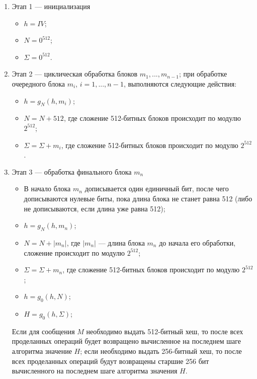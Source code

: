 \documentclass{./civarticle}
\begin{document}
\begin{enumerate}
    \item Этап 1 --- инициализация

    \begin{itemize}
        \item $h = IV$;
        \item $N = 0^{512}$;
        \item $\Sigma = 0^{512}$.
    \end{itemize}

    \item Этап 2 --- циклическая обработка блоков $m_1, ..., m_{n-1}$; при обработке очередного блока $m_i$, $i = 1, ..., n-1$, выполняются следующие действия:

    \begin{itemize}
        \item $h = g_N(h, m_i)$;
        \item $N = N + 512$, где сложение 512-битных блоков происходит по модулю $2^{512}$;
        \item $\Sigma = \Sigma + m_i$, где сложение 512-битных блоков происходит по модулю $2^{512}$.
    \end{itemize}


    \item Этап 3 --- обработка финального блока $m_n$

    \begin{itemize}
        \item В начало блока $m_n$ дописывается один единичный бит, после чего дописываются нулевые биты, пока длина блока не станет равна 512 (либо не дописываются, если длина уже равна 512);
        \item $h = g_N(h, m_n)$;
        \item $N = N + |m_n|$, где $|m_n|$ --- длина блока $m_n$ до начала его обработки, сложение происходит по модулю $2^{512}$;
        \item $\Sigma = \Sigma + m_n$, где сложение 512-битных блоков происходит по модулю $2^{512}$;
        \item $h = g_0(h, N)$;
        \item $H = g_0(h, \Sigma)$;
    \end{itemize}

    Если для сообщения $M$ необходимо выдать 512-битный хеш, то после всех проделанных операций будет возвращено вычисленное на последнем шаге алгоритма значение $H$; если необходимо выдать 256-битный хеш, то после всех проделанных операций будут возвращены старшие 256 бит вычисленного на последнем шаге алгоритма значения $H$.
    
\end{enumerate}
\end{document}
